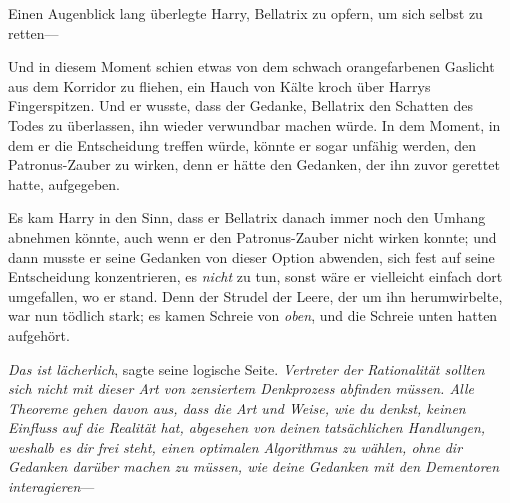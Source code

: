 Einen Augenblick lang überlegte Harry, Bellatrix zu opfern, um sich selbst zu retten—

Und in diesem Moment schien etwas von dem schwach orangefarbenen Gaslicht aus dem Korridor zu fliehen, ein Hauch von Kälte kroch über Harrys Fingerspitzen. Und er wusste, dass der Gedanke, Bellatrix den Schatten des Todes zu überlassen, ihn wieder verwundbar machen würde. In dem Moment, in dem er die Entscheidung treffen würde, könnte er sogar unfähig werden, den Patronus-Zauber zu wirken, denn er hätte den Gedanken, der ihn zuvor gerettet hatte, aufgegeben.

Es kam Harry in den Sinn, dass er Bellatrix danach immer noch den Umhang abnehmen könnte, auch wenn er den Patronus-Zauber nicht wirken konnte; und dann musste er seine Gedanken von dieser Option abwenden, sich fest auf seine Entscheidung konzentrieren, es \emph{nicht} zu tun, sonst wäre er vielleicht einfach dort umgefallen, wo er stand. Denn der Strudel der Leere, der um ihn herumwirbelte, war nun tödlich stark; es kamen Schreie von \emph{oben}, und die Schreie unten hatten aufgehört.

\emph{Das ist lächerlich}, sagte seine logische Seite. \emph{Vertreter der Rationalität sollten sich nicht mit dieser Art von zensiertem Denkprozess abfinden müssen. Alle Theoreme gehen davon aus, dass die Art und Weise, wie du denkst, keinen Einfluss auf die Realität hat, abgesehen von} \emph{deinen} \emph{tatsächlichen Handlungen, weshalb es} \emph{dir} \emph{frei steht, einen optimalen Algorithmus zu wählen, ohne} \emph{dir} \emph{Gedanken darüber machen zu müssen, wie} \emph{deine} \emph{Gedanken mit den Dementoren interagieren}—

